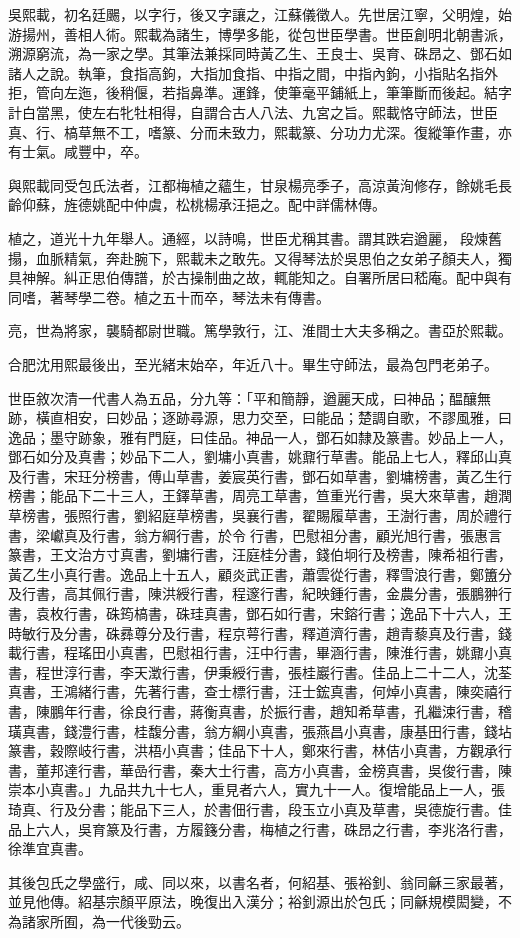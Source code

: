 \begin{pinyinscope}
吳熙載，初名廷颺，以字行，後又字讓之，江蘇儀徵人。先世居江寧，父明煌，始游揚州，善相人術。熙載為諸生，博學多能，從包世臣學書。世臣創明北朝書派，溯源窮流，為一家之學。其筆法兼採同時黃乙生、王良士、吳育、硃昂之、鄧石如諸人之說。執筆，食指高鉤，大指加食指、中指之間，中指內鉤，小指貼名指外拒，管向左迤，後稍偃，若指鼻準。運鋒，使筆毫平鋪紙上，筆筆斷而後起。結字計白當黑，使左右牝牡相得，自謂合古人八法、九宮之旨。熙載恪守師法，世臣真、行、槁草無不工，嗜篆、分而未致力，熙載篆、分功力尤深。復縱筆作畫，亦有士氣。咸豐中，卒。

與熙載同受包氏法者，江都梅植之蘊生，甘泉楊亮季子，高涼黃洵修存，餘姚毛長齡仰蘇，旌德姚配中仲虞，松桃楊承汪挹之。配中詳儒林傳。

植之，道光十九年舉人。通經，以詩鳴，世臣尤稱其書。謂其跌宕遒麗，段煉舊搨，血脈精氣，奔赴腕下，熙載未之敢先。又得琴法於吳思伯之女弟子顏夫人，獨具神解。糾正思伯傳譜，於古操制曲之故，輒能知之。自署所居曰嵇庵。配中與有同嗜，著琴學二卷。植之五十而卒，琴法未有傳書。

亮，世為將家，襲騎都尉世職。篤學敦行，江、淮間士大夫多稱之。書亞於熙載。

合肥沈用熙最後出，至光緒末始卒，年近八十。畢生守師法，最為包門老弟子。

世臣敘次清一代書人為五品，分九等：「平和簡靜，遒麗天成，曰神品；醖釀無跡，橫直相安，曰妙品；逐跡尋源，思力交至，曰能品；楚調自歌，不謬風雅，曰逸品；墨守跡象，雅有門庭，曰佳品。神品一人，鄧石如隸及篆書。妙品上一人，鄧石如分及真書；妙品下二人，劉墉小真書，姚鼐行草書。能品上七人，釋邱山真及行書，宋玨分榜書，傅山草書，姜宸英行書，鄧石如草書，劉墉榜書，黃乙生行榜書；能品下二十三人，王鐸草書，周亮工草書，笪重光行書，吳大來草書，趙潤草榜書，張照行書，劉紹庭草榜書，吳襄行書，翟賜履草書，王澍行書，周於禮行書，梁巘真及行書，翁方綱行書，於令行書，巴慰祖分書，顧光旭行書，張惠言篆書，王文治方寸真書，劉墉行書，汪庭桂分書，錢伯坰行及榜書，陳希祖行書，黃乙生小真行書。逸品上十五人，顧炎武正書，蕭雲從行書，釋雪浪行書，鄭簠分及行書，高其佩行書，陳洪綬行書，程邃行書，紀映鍾行書，金農分書，張鵬翀行書，袁枚行書，硃筠槁書，硃珪真書，鄧石如行書，宋鎔行書；逸品下十六人，王時敏行及分書，硃彞尊分及行書，程京萼行書，釋道濟行書，趙青藜真及行書，錢載行書，程瑤田小真書，巴慰祖行書，汪中行書，畢涵行書，陳淮行書，姚鼐小真書，程世淳行書，李天澂行書，伊秉綬行書，張桂巖行書。佳品上二十二人，沈荃真書，王鴻緒行書，先著行書，查士標行書，汪士鋐真書，何焯小真書，陳奕禧行書，陳鵬年行書，徐良行書，蔣衡真書，於振行書，趙知希草書，孔繼涑行書，稽璜真書，錢澧行書，桂馥分書，翁方綱小真書，張燕昌小真書，康基田行書，錢坫篆書，穀際岐行書，洪梧小真書；佳品下十人，鄭來行書，林佶小真書，方觀承行書，董邦達行書，華嵒行書，秦大士行書，高方小真書，金榜真書，吳俊行書，陳崇本小真書。」九品共九十七人，重見者六人，實九十一人。復增能品上一人，張琦真、行及分書；能品下三人，於書佃行書，段玉立小真及草書，吳德旋行書。佳品上六人，吳育篆及行書，方履籛分書，梅植之行書，硃昂之行書，李兆洛行書，徐準宜真書。

其後包氏之學盛行，咸、同以來，以書名者，何紹基、張裕釗、翁同龢三家最著，並見他傳。紹基宗顏平原法，晚復出入漢分；裕釗源出於包氏；同龢規模閎變，不為諸家所囿，為一代後勁云。


\end{pinyinscope}